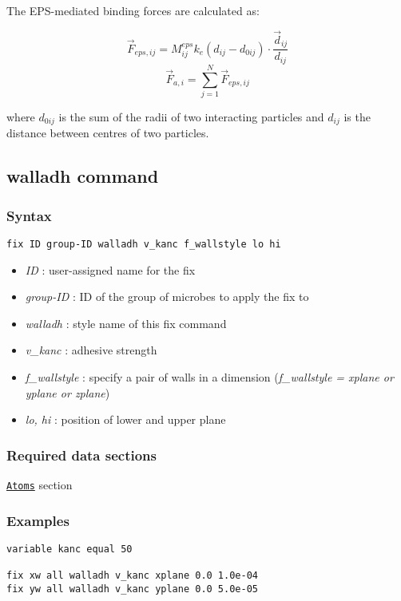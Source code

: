 \documentclass[11pt,a4paper,openright]{article}
\begin{document}
The EPS-mediated binding forces are calculated as:

\[ \overrightarrow{F}_{eps,ij} = M^{eps}_{ij} k_{e} (d_{ij} - d_{0ij})\cdot\dfrac{\overrightarrow{d}_{ij}}{d_{ij}} \] 
\[ \overrightarrow{F}_{a,i} = \sum_{j=1}^{N} \overrightarrow{F}_{eps,ij} \] 

where $ d_{0ij}$ is the sum of the radii of two interacting particles and $d_{ij}$ is the distance between centres of two particles.

\newpage
\subsection{walladh command}
\label{walladh}
\subsubsection*{Syntax}
\begin{Verbatim}[frame=single]
fix ID group-ID walladh v_kanc f_wallstyle lo hi
\end{Verbatim}

\begin{itemize}  [nosep]
\item
	{\it ID }: user-assigned name for the fix
\item
	{\it group-ID }: ID of the group of microbes to apply the fix to
\item
	{\it walladh }: style name of this fix command
\item
	{\it v\_kanc }: adhesive strength
\item
	{\it f\_wallstyle }: specify a pair of walls in a dimension ({\it f\_wallstyle 		= xplane or yplane or zplane})
\item
	{\it lo, hi }: position of lower and upper plane

\end{itemize}

\subsubsection*{Required data sections} 
\hyperref[satom]{\tt Atoms} section


\subsubsection*{Examples}

\begin{Verbatim}[frame=single]
variable kanc equal 50

fix xw all walladh v_kanc xplane 0.0 1.0e-04
fix yw all walladh v_kanc yplane 0.0 5.0e-05
\end{Verbatim}
\end{document}
